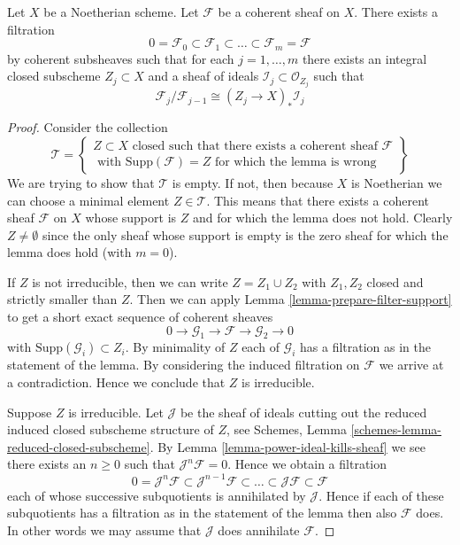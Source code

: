 \begin{lemma}
\label{lemma-coherent-filter}
Let $X$ be a Noetherian scheme.
Let $\mathcal{F}$ be a coherent sheaf on $X$.
There exists a filtration
$$
0 = \mathcal{F}_0 \subset \mathcal{F}_1 \subset
\ldots \subset \mathcal{F}_m = \mathcal{F}
$$
by coherent subsheaves such that for each $j = 1, \ldots, m$
there exists an integral closed subscheme $Z_j \subset X$
and a sheaf of ideals $\mathcal{I}_j \subset \mathcal{O}_{Z_j}$
such that
$$
\mathcal{F}_j/\mathcal{F}_{j - 1}
\cong (Z_j \to X)_* \mathcal{I}_j
$$
\end{lemma}

\begin{proof}
Consider the collection
$$
\mathcal{T} =
\left\{
\begin{matrix}
Z \subset X
\text{ closed such that there exists a coherent sheaf }
\mathcal{F} \\
\text{ with }
\text{Supp}(\mathcal{F}) = Z
\text{ for which the lemma is wrong}
\end{matrix}
\right\}
$$
We are trying to show that $\mathcal{T}$ is empty. If not, then
because $X$ is Noetherian we can choose a minimal element
$Z \in \mathcal{T}$. This means that there exists a coherent
sheaf $\mathcal{F}$ on $X$ whose support is $Z$ and for which the
lemma does not hold. Clearly $Z \not = \emptyset$ since the only
sheaf whose support is empty is the zero sheaf for which the
lemma does hold (with $m = 0$).

\medskip\noindent
If $Z$ is not irreducible, then we can write $Z = Z_1 \cup Z_2$
with $Z_1, Z_2$ closed and strictly smaller than $Z$.
Then we can apply Lemma \ref{lemma-prepare-filter-support}
to get a short exact sequence of coherent sheaves
$$
0 \to
\mathcal{G}_1 \to
\mathcal{F} \to
\mathcal{G}_2 \to 0
$$
with $\text{Supp}(\mathcal{G}_i) \subset Z_i$. By minimality of
$Z$ each of $\mathcal{G}_i$ has a filtration as in the statement
of the lemma. By considering the induced filtration on $\mathcal{F}$
we arrive at a contradiction. Hence we conclude
that $Z$ is irreducible.

\medskip\noindent
Suppose $Z$ is irreducible. Let $\mathcal{J}$ be the sheaf of ideals
cutting out the reduced induced closed subscheme structure of $Z$,
see Schemes, Lemma \ref{schemes-lemma-reduced-closed-subscheme}.
By Lemma \ref{lemma-power-ideal-kills-sheaf} we see there exists
an $n \geq 0$ such that $\mathcal{J}^n\mathcal{F} = 0$. Hence we obtain
a filtration
$$
0 = \mathcal{J}^n\mathcal{F} \subset \mathcal{J}^{n - 1}\mathcal{F}
\subset \ldots \subset \mathcal{J}\mathcal{F} \subset \mathcal{F}
$$
each of whose successive subquotients is annihilated by $\mathcal{J}$.
Hence if each of these subquotients has a filtration as in the statement
of the lemma then also $\mathcal{F}$ does. In other words we may
assume that $\mathcal{J}$ does annihilate $\mathcal{F}$.


\end{proof}
